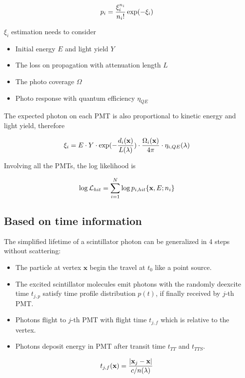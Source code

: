\documentclass{article}
\begin{document}
	\begin{equation}
	\numberwithin{equation}{section}
	p_i = \frac{\xi_i^{n_i}}{n_i!} \exp(-\xi_i)
	\end{equation}
	
	\par $\xi_i$ estimation needs to consider
	\begin{itemize}
		\item Initial energy $E$ and light yield $Y$
		\item The loss on propagation with attenuation length $L$
		\item The photo coverage $\Omega$ 
		\item Photo response with quantum efficiency $\eta_{QE}$
	\end{itemize}
	
	\par The expected photon on each PMT is also proportional to kinetic energy and light yield, therefore
	
	\begin{equation}
	\numberwithin{equation}{section}
	\xi_i = E\cdot Y\cdot \exp(-\frac{d_i({\textbf x})}{L(\lambda)}) \cdot \frac{\Omega_i({\textbf x})}{4\pi} \cdot\eta_{i,QE}(\lambda)
	\end{equation}

	\par Involving all the PMTs, the log likelihood is
	
	\begin{equation}
	\numberwithin{equation}{section}
	\log \mathcal{L}_{hit} = \sum_{i=1}^N \log p_{i,hit} \{{\textbf x},E;n_{i}\}
	\end{equation}
\subsection{Based on time information}
	\par The simplified lifetime of a scintillator photon can be generalized in 4 steps without scattering: 
	\begin{itemize}
	\item The particle at vertex $\textbf {x}$ begin the travel at $t_0$ like a point source.  
	\item The excited scintillator molecules emit photons with the randomly deexcite time $t_{j,p}$ satisfy time profile distribution $p(t)$, if finally received by $j$-th PMT.
	\item Photons flight to $j$-th PMT with flight time $t_{j,f}$ which is relative to the vertex.
	\item Photons deposit energy in PMT after transit time $t_{TT}$ and $t_{TTS}$.
	\end{itemize}
	\begin{equation}
		\numberwithin{equation}{section}
		t_{j,f}(\textbf x)=\frac{{|\textbf x_j}-{\textbf x|}}{c/n(\lambda)}
	\end{equation}
\end{document}
